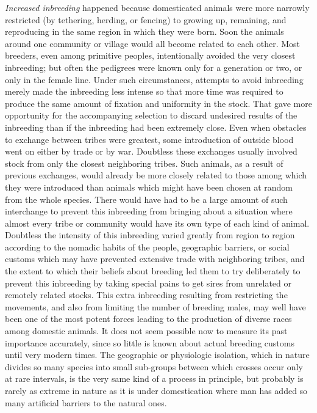 \textit{Increased inbreeding} happened because domesticated animals were more narrowly restricted (by tethering, herding, or 
fencing) to growing up, remaining, and reproducing in the same region in which they were born. Soon the animals around one 
community or village would all become related to each other. Most breeders, even among primitive peoples, intentionally 
avoided the very closest inbreeding; but often the pedigrees were known only for a generation or two, or only in the female 
line. Under such circumstances, attempts to avoid inbreeding merely made the inbreeding less intense so that more time was 
required to produce the same amount of fixation and uniformity in the stock. That gave more opportunity for the accompanying 
selection to discard undesired results of the inbreeding than if the inbreeding had been extremely close. Even when 
obstacles to exchange between tribes were greatest, some introduction of outside blood went on either by trade or by war. 
Doubtless these exchanges usually involved stock from only the closest neighboring tribes. Such animals, as a result of 
previous exchanges, would already be more closely related to those among which they were introduced than animals which might 
have been chosen at random from the whole species. There would have had to be a large amount of such interchange to prevent 
this inbreeding from bringing about a situation where almost every tribe or community would have its own type of each kind 
of animal. Doubtless the intensity of this inbreeding varied greatly from region to region according to the nomadic habits 
of the people, geographic barriers, or social customs which may have prevented extensive trade with neighboring tribes, and 
the extent to which their beliefs about breeding led them to try deliberately to prevent this inbreeding by taking special 
pains to get sires from unrelated or remotely related stocks. This extra inbreeding resulting from restricting the 
movements, and also from limiting the number of breeding males, may well have been one of the most potent forces leading to 
the production of diverse races among domestic animals. It does not seem possible now to measure its past importance 
accurately, since so little is known about actual breeding customs until very modern times. The geographic or physiologic 
isolation, which in nature divides so many species into small sub-groups between which crosses occur only at rare intervals, 
is the very same kind of a process in principle, but probably is rarely as extreme in nature as it is under domestication 
where man has added so many artificial barriers to the natural ones.

